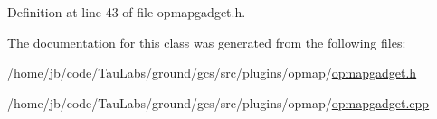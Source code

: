 \-Definition at line 43 of file opmapgadget.\-h.



\-The documentation for this class was generated from the following files\-:\begin{DoxyCompactItemize}
\item 
/home/jb/code/\-Tau\-Labs/ground/gcs/src/plugins/opmap/\hyperlink{opmapgadget_8h}{opmapgadget.\-h}\item 
/home/jb/code/\-Tau\-Labs/ground/gcs/src/plugins/opmap/\hyperlink{opmapgadget_8cpp}{opmapgadget.\-cpp}\end{DoxyCompactItemize}
